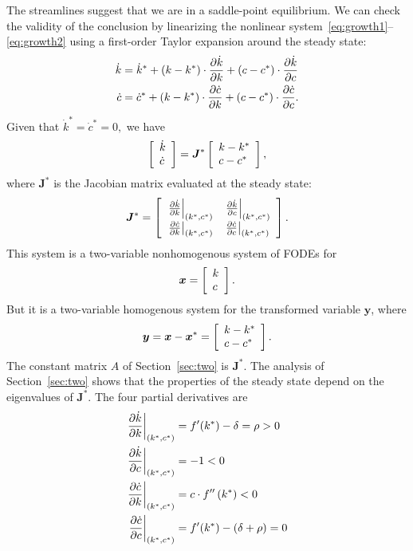 \documentclass[letterpaper,12pt,leqno]{article}
\begin{document}
The streamlines suggest that we are in a saddle-point equilibrium. We can check the validity of the conclusion by linearizing the nonlinear system~\eqref{eq:growth1}--\eqref{eq:growth2} using a first-order Taylor expansion around the steady state:
\begin{align*}
\dot{k} &=\dot{k}^{*} +\left( k-k^{*} \right) \cdot \frac{\partial \dot{k}}{\partial k}+\left( c-c^{*} \right)\cdot \frac{\partial \dot{k}}{\partial c} \\
\dot{c} &=\dot{c}^{*} +\left( k-k^{*} \right)\cdot  \frac{\partial \dot{c}}{\partial k}+\left( c-c^{*} \right)\cdot \frac{\partial \dot{c}}{\partial c}.
\end{align*}
Given that $\dot{k}^{*} =\dot{c}^{*} =0,$ we have 
\begin{equation*}
\left[ \begin{array}{l}
\dot{k}\\ 
\dot{c}
\end{array} \right] =\bm{J}^{*}\left[ 
\begin{array}{l}
k-k^{*} \\ 
c-c^{*}
\end{array} \right],
\end{equation*}
where $\bm{J}^{*}$ is the Jacobian matrix evaluated at the steady state:
\begin{equation*}
\bm{J}^{*}=\left[ 
\begin{array}{ll}
\left.\frac{\partial \dot{k}}{\partial k}\right\vert_{(k^{*},c^{*})}  & \left.\frac{\partial \dot{k}}{\partial c}\right\vert_{(k^{*},c^{*})} \\ 
\left.\frac{\partial \dot{c}}{\partial k}\right\vert_{(k^{*},c^{*})} & \left.\frac{\partial \dot{c}}{\partial c}\right\vert_{(k^{*},c^{*})}
\end{array} \right].
\end{equation*}
This system is a two-variable nonhomogenous system of FODEs
for \[\bm{x}=\left[ \begin{array}{l}
k\\ 
c
\end{array} \right].\] But it is a two-variable homogenous system for the transformed variable $\bm{y}$, where
\begin{equation*}
\bm{y}=\bm{x}-\bm{x}^{*}=\left[ 
\begin{array}{l}
k-k^{*}\\ 
c-c^{*}
\end{array} \right].
\end{equation*}
The constant matrix $A$ of Section~\ref{sec:two} is  $\bm{J}^{*}$. The analysis of Section~\ref{sec:two} shows that
the properties of the steady state depend on the eigenvalues of $\bm{J}^{*}$. The four partial derivatives are
\begin{align*}
\left.\frac{\partial \dot{k}}{\partial k}\right\vert_{(k^{*},c^{*})}&=f'(k^{*}) -\delta =\rho >0 \\
\left.\frac{\partial \dot{k}}{\partial c}\right\vert_{(k^{*},c^{*})}&=-1<0 \\
\left.\frac{\partial \dot{c}}{\partial k}\right\vert_{(k^{*},c^{*})}&=c\cdot f''\left( k^{*} \right) <0 \\
\left.\frac{\partial \dot{c}}{\partial c}\right\vert_{(k^{*},c^{*})}&=f'(k^{*}) -\left( \delta +\rho \right) =0
\end{align*}
\end{document}
